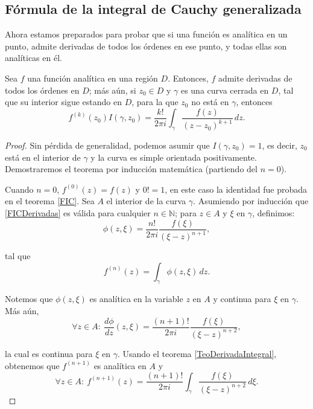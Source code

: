 \subsection{Fórmula de la integral de Cauchy generalizada }

Ahora estamos preparados para probar que si una función es analítica en un punto, admite derivadas de todos los órdenes en ese punto, y todas ellas son analíticas en él.

\begin{teorema} \label{GeneralFIC}
Sea $f$ una función analítica en una región $D$. Entonces, $f$ admite derivadas de todos los órdenes en $D$; más aún, si $z_0 \in D$ y $\gamma$ es una curva cerrada en $D$, tal que su interior sigue estando en $D$, para la que $z_0$ no está en $\gamma$, entonces
\begin{equation}
f^{(k)}(z_0) I(\gamma,z_0) =  \frac{k!}{2\pi i} \int_{\gamma} \frac{f(z)}{(z-z_0)^{k+1}} \,dz.    \label{FICDerivadas}
\end{equation}

\end{teorema}

\begin{proof}
Sin pérdida de generalidad, podemos asumir que $I(\gamma,z_0) = 1$, es decir, $z_0$ está en el interior de $\gamma$ y la curva es simple orientada positivamente. Demostraremos el teorema por inducción matemática (partiendo del $n = 0$). 

Cuando $n = 0$, $f^{(0)}(z) = f(z)$ y $0! = 1$, en este caso la identidad fue probada en el teorema \ref{FIC}. Sea $A$ el interior de la curva $\gamma$. Asumiendo por inducción que \eqref{FICDerivadas} es válida para cualquier $n \in \mathbb{N}$; para $z \in A$ y $\xi$ en $\gamma$, definimos:
$$\phi(z,\xi) = \frac{n!}{2\pi i} \frac{f(\xi)}{(\xi-z)^{n+1}},$$

tal que
$$f^{(n)}(z) = \int_{\gamma} \phi(z,\xi) \,dz.$$

Notemos que $\phi(z,\xi)$ es analítica en la variable $z$ en $A$ y continua para $\xi$ en $\gamma$. Más aún, 
$$\forall z \in A: ~ \frac{d\phi}{dz}(z,\xi) = \frac{(n+1)!}{2\pi i} \frac{f(\xi)}{(\xi - z)^{n+2}},$$

la cual es continua para $\xi$ en $\gamma$. Usando el teorema \ref{TeoDerivadaIntegral}, obtenemos que $f^{(n+1)}$ es analítica en $A$ y
$$\forall z \in A: ~ f^{(n+1)}(z) = \frac{(n+1)!}{2\pi i} \int_{\gamma} \frac{f(\xi)}{(\xi-z)^{n+2}} \,d\xi.$$
\end{proof}

